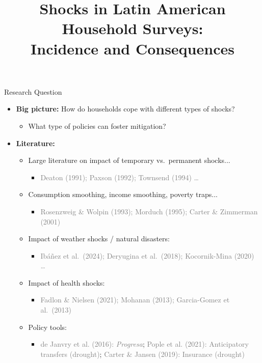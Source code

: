 \documentclass[aspectratio = 169]{beamer}
\title[]{Shocks in Latin American Household Surveys: \\ Incidence and Consequences}
\date{
	
	April 2025}
\begin{document}
\begin{frame}
  \titlepage
\end{frame}
\begin{frame}{Research Question}

	\begin{itemize}
  
	  \item \textbf{Big picture:} How do households cope with different types of shocks?
		\begin{itemize}
		  \item What type of policies can foster mitigation?
		\end{itemize}
		\bigskip
  
	  \item \textbf{Literature:}
		\begin{itemize}
  
		  \item Large literature on impact of temporary vs.\ permanent shocks...
			\begin{itemize}
			  \item \textcolor{gray}{Deaton (1991); Paxson (1992); Townsend (1994) \dots}
			\end{itemize}
			\smallskip
  
		  \item Consumption smoothing, income smoothing, poverty traps...
			\begin{itemize}
			  \item \textcolor{gray}{Rosenzweig \& Wolpin (1993); Morduch (1995); Carter \& Zimmerman (2001)}
			\end{itemize}
			\smallskip
  
		  \item Impact of weather shocks / natural disasters:
			\begin{itemize}
			  \item \textcolor{gray}{Ibáñez et al.\ (2024); Deryugina et al.\ (2018); Kocornik-Mina (2020) \dots}
			\end{itemize}
			\smallskip
  
		  \item Impact of health shocks:
			\begin{itemize}
			  \item \textcolor{gray}{Fadlon \& Nielsen (2021); Mohanan (2013); Garcia-Gomez et al.\ (2013)}
			\end{itemize}
			\smallskip
  
		  \item Policy tools:
			\begin{itemize}
			  \item \textcolor{gray}{de Janvry et al. (2016): \emph{Progresa}}; \textcolor{gray}{Pople et al. (2021): Anticipatory transfers (drought)}; \textcolor{gray}{Carter \& Jansen (2019): Insurance (drought)}
			\end{itemize}
  
		\end{itemize}
  
	\end{itemize}
  
  \end{frame}
  
\end{document}
